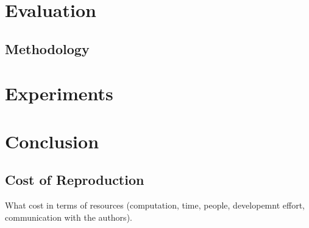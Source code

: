 \documentclass[10pt,twocolumn,letterpaper]{article}
\begin{document}
\section{Evaluation}
\label{sec:evaluation}

\subsection{Methodology}

\section{Experiments}

\section{Conclusion}
\label{sec:conclusion}

\subsection{Cost of Reproduction}
What cost in terms of resources (computation, time, people, developemnt effort, communication with the authors).

{\small


}
\end{document}
